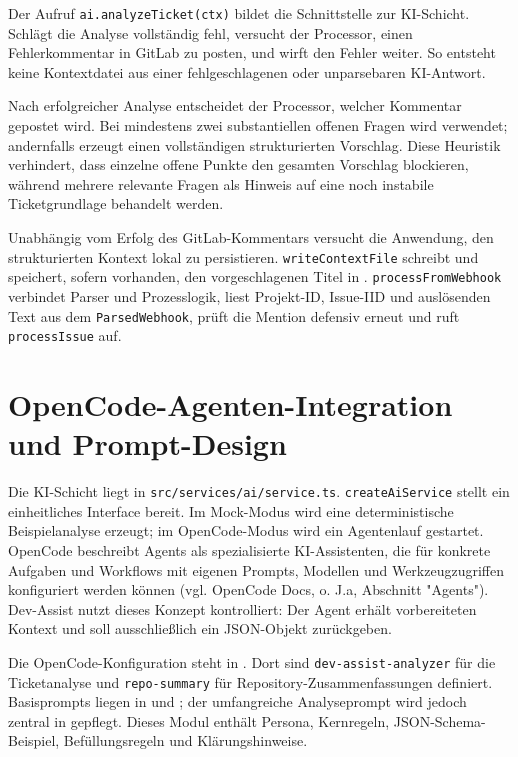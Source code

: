 \documentclass[12pt,a4paper,oneside]{scrreprt}
\begin{document}
Der Aufruf \texttt{ai.analyzeTicket(ctx)} bildet die Schnittstelle zur KI-Schicht. Schlägt die Analyse vollständig fehl, versucht der Processor, einen Fehlerkommentar in GitLab zu posten, und wirft den Fehler weiter. So entsteht keine Kontextdatei aus einer fehlgeschlagenen oder unparsebaren KI-Antwort.

Nach erfolgreicher Analyse entscheidet der Processor, welcher Kommentar gepostet wird. Bei mindestens zwei substantiellen offenen Fragen wird  verwendet; andernfalls erzeugt  einen vollständigen strukturierten Vorschlag. Diese Heuristik verhindert, dass einzelne offene Punkte den gesamten Vorschlag blockieren, während mehrere relevante Fragen als Hinweis auf eine noch instabile Ticketgrundlage behandelt werden.

Unabhängig vom Erfolg des GitLab-Kommentars versucht die Anwendung, den strukturierten Kontext lokal zu persistieren. \texttt{writeContextFile} schreibt  und speichert, sofern vorhanden, den vorgeschlagenen Titel in . \texttt{processFromWebhook} verbindet Parser und Prozesslogik, liest Projekt-ID, Issue-IID und auslösenden Text aus dem \texttt{ParsedWebhook}, prüft die Mention defensiv erneut und ruft \texttt{processIssue} auf.

\section{OpenCode-Agenten-Integration und Prompt-Design}

Die KI-Schicht liegt in \texttt{src/services/ai/service.ts}. \texttt{createAiService} stellt ein einheitliches Interface bereit. Im Mock-Modus wird eine deterministische Beispielanalyse erzeugt; im OpenCode-Modus wird ein Agentenlauf gestartet. OpenCode beschreibt Agents als spezialisierte KI-Assistenten, die für konkrete Aufgaben und Workflows mit eigenen Prompts, Modellen und Werkzeugzugriffen konfiguriert werden können (vgl. OpenCode Docs, o. J.a, Abschnitt "Agents"). Dev-Assist nutzt dieses Konzept kontrolliert: Der Agent erhält vorbereiteten Kontext und soll ausschließlich ein JSON-Objekt zurückgeben.

Die OpenCode-Konfiguration steht in . Dort sind \texttt{dev-assist-analyzer} für die Ticketanalyse und \texttt{repo-summary} für Repository-Zusammenfassungen definiert. Basisprompts liegen in  und ; der umfangreiche Analyseprompt wird jedoch zentral in  gepflegt. Dieses Modul enthält Persona, Kernregeln, JSON-Schema-Beispiel, Befüllungsregeln und Klärungshinweise.
\end{document}
